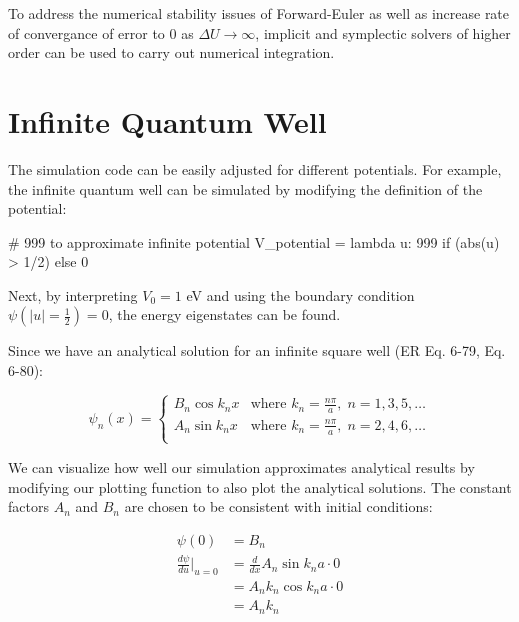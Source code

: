 \documentclass{article}
\begin{document}
To address the numerical stability issues of Forward-Euler as well as increase
rate of convergance of error to $0$ as $\Delta U \rightarrow \infty$, implicit
and symplectic solvers of higher order can be used to carry out numerical
integration.

\section{Infinite Quantum Well}\label{sec:InfWell}

The simulation code can be easily adjusted for different potentials. For
example, the infinite quantum well can be simulated by modifying the definition
of the potential:

\begin{sageblock}
# 999 to approximate infinite potential
V_potential = lambda u: 999 if (abs(u) > 1/2) else 0
\end{sageblock}

Next, by interpreting $V_0 = 1$ eV and using the boundary condition
$\psi(\text{\(\lvert u\rvert\)}=\frac{1}{2}) = 0$, the energy eigenstates can be found.

Since we have an analytical solution for an infinite square well (ER Eq. 6-79,
Eq. 6-80):

\begin{equation}
    \psi_n(x) = 
    \begin{cases}
        B_n \cos k_n x &\text{where } k_n = \frac{n\pi}{a},\; n = 1,3,5,\ldots\\
        A_n \sin k_n x &\text{where } k_n = \frac{n\pi}{a},\; n = 2,4,6,\ldots\\
    \end{cases}
\end{equation}

We can visualize how well our simulation approximates analytical results by modifying our
plotting function to also plot the analytical solutions. The constant factors $A_n$ and $B_n$
are chosen to be consistent with initial conditions:

\begin{align}
    \psi(0) &= B_n \\
    \frac{d\psi}{du}\bigg|_{u=0} &= \frac{d}{dx}A_n \sin k_n a\cdot0 \nonumber \\
                        &= A_n k_n \cos k_n a\cdot0 \nonumber \\
                        &= A_n k_n
\end{align}
\end{document}
